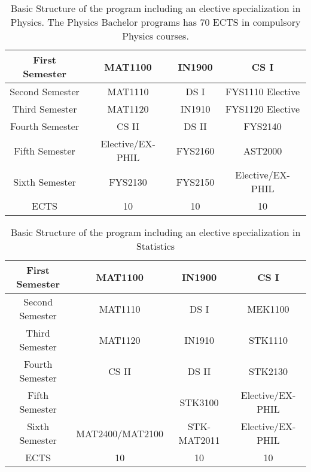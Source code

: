\documentclass[oneside,final,10pt]{article}
\begin{document}
\begin{table}[]
    \centering
    \begin{tabular}{|c|c|c|c|} \hline
    First Semester & MAT1100 &  IN1900   & CS I \\ \hline 
    Second Semester & MAT1110 &  DS I   & FYS1110 Elective \\ \hline
    Third Semester & MAT1120 &  IN1910   & FYS1120  Elective\\ \hline
    Fourth Semester & CS II & DS II    & FYS2140 \\ \hline       
    Fifth Semester & Elective/EX-PHIL & FYS2160     & AST2000 \\ \hline
    Sixth Semester & FYS2130 & FYS2150    & Elective/EX-PHIL \\ \hline
   ECTS & 10 &  10   &  10  \\ \hline    
    \end{tabular}
    \caption{Basic Structure of the program including an elective specialization in Physics. The Physics Bachelor programs has 70 ECTS in compulsory Physics courses.}
\end{table}

\begin{table}[]
    \centering
    \begin{tabular}{|c|c|c|c|} \hline
    First Semester & MAT1100 &  IN1900   & CS I \\ \hline 
    Second Semester & MAT1110 &  DS I   & MEK1100 \\ \hline
    Third Semester & MAT1120 &  IN1910   &  STK1110\\ \hline
    Fourth Semester & CS II & DS II    & STK2130 \\ \hline       
    Fifth Semester & & STK3100     & Elective/EX-PHIL \\ \hline
    Sixth Semester & MAT2400/MAT2100 & STK-MAT2011    & Elective/EX-PHIL \\ \hline
   ECTS & 10 &  10   &  10  \\ \hline    
    \end{tabular}
    \caption{Basic Structure of the program including an elective specialization in Statistics}
\end{table}
\end{document}
